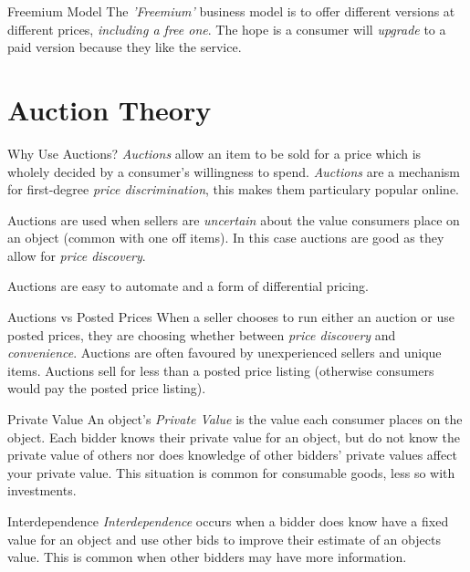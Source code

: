 \documentclass[11pt,a4paper]{article}
\begin{document}
\begin{proposition}{Freemium Model}
  The \textit{'Freemium'} business model is to offer different versions at different prices, \textit{including a free one}. The hope is a consumer will \textit{upgrade} to a paid version because they like the service.
\end{proposition}

\section{Auction Theory}

\begin{remark}{Why Use Auctions?}
  \textit{Auctions} allow an item to be sold for a price which is wholely decided by a consumer's willingness to spend. \textit{Auctions} are a mechanism for first-degree \textit{price discrimination}, this makes them particulary popular online.
  \par Auctions are used when sellers are \textit{uncertain} about the value consumers place on an object (common with one off items). In this case auctions are good as they allow for \textit{price discovery}.
  \par Auctions are easy to automate and a form of differential pricing.
\end{remark}

\begin{proposition}{Auctions vs Posted Prices}
  When a seller chooses to run either an auction or use posted prices, they are choosing whether between \textit{price discovery} and \textit{convenience}. Auctions are often favoured by unexperienced sellers and unique items. Auctions sell for less than a posted price listing (otherwise consumers would pay the posted price listing).
\end{proposition}

\begin{definition}{Private Value}
  An object's \textit{Private Value} is the value each consumer places on the object. Each bidder knows their private value for an object, but do not know the private value of others nor does knowledge of other bidders' private values affect your private value. This situation is common for consumable goods, less so with investments.
\end{definition}

\begin{definition}{Interdependence}
  \textit{Interdependence} occurs when a bidder does know have a fixed value for an object and use other bids to improve their estimate of an objects value. This is common when other bidders may have more information.
\end{definition}
\end{document}
